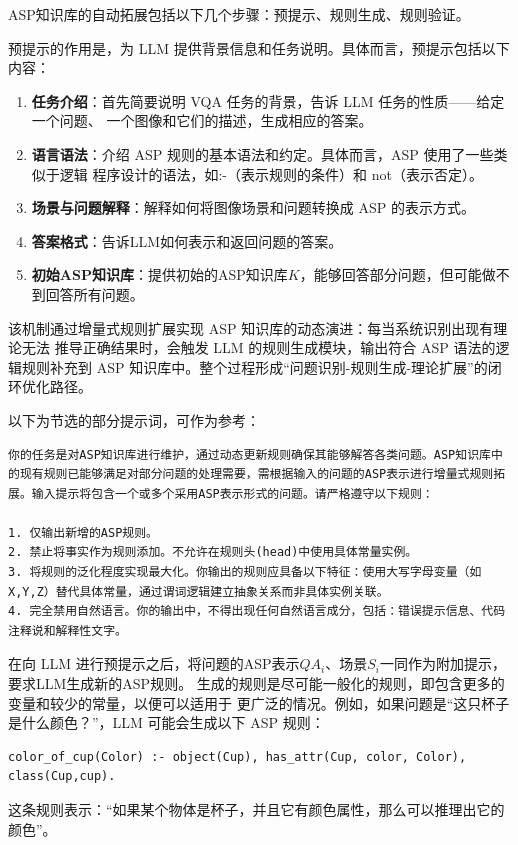 ASP知识库的自动拓展包括以下几个步骤：预提示、规则生成、规则验证。

预提示的作用是，为 LLM 提供背景信息和任务说明。具体而言，预提示包括以下内容：
\begin{enumerate}[itemsep=0pt,parsep=0pt]
\item \textbf{任务介绍}：首先简要说明 VQA 任务的背景，告诉 LLM 任务的性质——给定一个问题、
一个图像和它们的描述，生成相应的答案。
\item \textbf{语言语法}：介绍 ASP 规则的基本语法和约定。具体而言，ASP 使用了一些类似于逻辑
程序设计的语法，如:-（表示规则的条件）和 not（表示否定）。
\item \textbf{场景与问题解释}：解释如何将图像场景和问题转换成 ASP 的表示方式。
\item \textbf{答案格式}：告诉LLM如何表示和返回问题的答案。
\item \textbf{初始ASP知识库}：提供初始的ASP知识库$K$，能够回答部分问题，但可能做不到回答所有问题。
\end{enumerate}

该机制通过增量式规则扩展实现 ASP 知识库的动态演进：每当系统识别出现有理论无法
推导正确结果时，会触发 LLM 的规则生成模块，输出符合 ASP 语法的逻辑规则补充到 ASP
知识库中。整个过程形成“问题识别-规则生成-理论扩展”的闭环优化路径。

以下为节选的部分提示词，可作为参考：
\begin{lstlisting}
你的任务是对ASP知识库进行维护，通过动态更新规则确保其能够解答各类问题。ASP知识库中的现有规则已能够满足对部分问题的处理需要，需根据输入的问题的ASP表示进行增量式规则拓展。输入提示将包含一个或多个采用ASP表示形式的问题。请严格遵守以下规则：

1. 仅输出新增的ASP规则。
2. 禁止将事实作为规则添加。不允许在规则头(head)中使用具体常量实例。
3. 将规则的泛化程度实现最大化。你输出的规则应具备以下特征：使用大写字母变量（如X,Y,Z）替代具体常量，通过谓词逻辑建立抽象关系而非具体实例关联。
4. 完全禁用自然语言。你的输出中，不得出现任何自然语言成分，包括：错误提示信息、代码注释说和解释性文字。
\end{lstlisting}

在向 LLM 进行预提示之后，将问题的ASP表示$QA_i$、场景$S_i$一同作为附加提示，要求LLM生成新的ASP规则。
生成的规则是尽可能一般化的规则，即包含更多的变量和较少的常量，以便可以适用于
更广泛的情况。例如，如果问题是“这只杯子是什么颜色？”，LLM 可能会生成以下 ASP 规则：
\begin{lstlisting}
color_of_cup(Color) :- object(Cup), has_attr(Cup, color, Color), class(Cup,cup).
\end{lstlisting}
这条规则表示：“如果某个物体是杯子，并且它有颜色属性，那么可以推理出它的颜色”。


